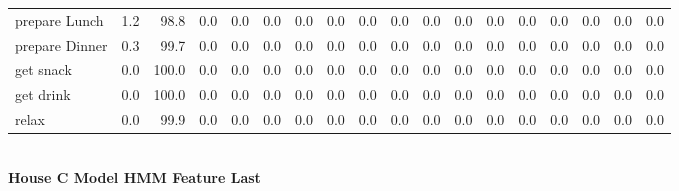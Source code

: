 \documentclass{article}
\begin{document}
\begin{sideways}
\begin{tabular}{lrrrrrrrrrrrrrrrrr}
prepare Lunch         &         1.2 &               98.8 &           0.0 &                          0.0 &                0.0 &                0.0 &                        0.0 &          0.0 &              0.0 &                0.0 &                    0.0 &                      0.0 &                  0.0 &                   0.0 &              0.0 &              0.0 &          0.0 \\
prepare Dinner        &         0.3 &               99.7 &           0.0 &                          0.0 &                0.0 &                0.0 &                        0.0 &          0.0 &              0.0 &                0.0 &                    0.0 &                      0.0 &                  0.0 &                   0.0 &              0.0 &              0.0 &          0.0 \\
get snack             &         0.0 &              100.0 &           0.0 &                          0.0 &                0.0 &                0.0 &                        0.0 &          0.0 &              0.0 &                0.0 &                    0.0 &                      0.0 &                  0.0 &                   0.0 &              0.0 &              0.0 &          0.0 \\
get drink             &         0.0 &              100.0 &           0.0 &                          0.0 &                0.0 &                0.0 &                        0.0 &          0.0 &              0.0 &                0.0 &                    0.0 &                      0.0 &                  0.0 &                   0.0 &              0.0 &              0.0 &          0.0 \\
relax                 &         0.0 &               99.9 &           0.0 &                          0.0 &                0.0 &                0.0 &                        0.0 &          0.0 &              0.0 &                0.0 &                    0.0 &                      0.0 &                  0.0 &                   0.0 &              0.0 &              0.0 &          0.0 \\
\bottomrule
\end{tabular}
\end{sideways}
\normalsize
\vspace{1cm}\\
\textbf{House C Model HMM Feature Last}\\
\vspace{1cm}\\
\end{document}
